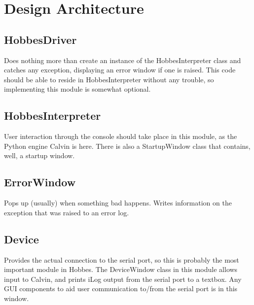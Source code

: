\documentclass[12pt,letterpaper]{article}
\begin{document}
%
%
\section{Design Architecture}
\label{2}

\setcounter{subsection}{-1}



%
%
\subsection{HobbesDriver}
\label{2.0}

Does nothing more than create an instance of the HobbesInterpreter class and catches any exception, displaying an error window if one is raised. This code should be able to reside in HobbesInterpreter without any trouble, so implementing this module is somewhat optional.



%
%
\subsection{HobbesInterpreter}
\label{2.1}

User interaction through the console should take place in this module, as the Python engine Calvin is here. There is also a StartupWindow class that contains, well, a startup window.



%
%
\subsection{ErrorWindow}
\label{2.2}

Pops up (usually) when something bad happens. Writes information on the exception that was raised to an error log.



%
%
\subsection{Device}
\label{2.3}

Provides the actual connection to the serial port, so this is probably the most important module in Hobbes. The DeviceWindow class in this module allows input to Calvin, and prints iLog output from the serial port to a textbox. Any GUI components to aid user communication to/from the serial port is in this window.
\end{document}
